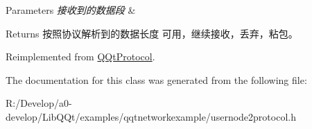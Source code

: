 \begin{DoxyParams}{Parameters}
{\em 接收到的数据段} & \\
\hline
\end{DoxyParams}
\begin{DoxyReturn}{Returns}
按照协议解析到的数据长度 可用，继续接收，丢弃，粘包。 
\end{DoxyReturn}


Reimplemented from \mbox{\hyperlink{class_q_qt_protocol_a00fd0c1ac23379ed3b9b25da9a34f39b}{Q\+Qt\+Protocol}}.



The documentation for this class was generated from the following file\+:\begin{DoxyCompactItemize}
\item 
R\+:/\+Develop/a0-\/develop/\+Lib\+Q\+Qt/examples/qqtnetworkexample/usernode2protocol.\+h\end{DoxyCompactItemize}
